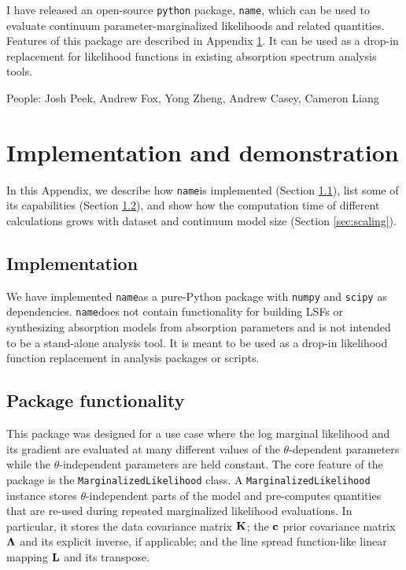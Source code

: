 \documentclass[manuscript]{aastex62}
\newcommand{\vx}[1]{{\bf {#1}}}
\newcommand{\pkgname}{\texttt{name}}
\begin{document}
I have released an open-source \texttt{python} package, \pkgname, which can be used to evaluate continuum parameter-marginalized likelihoods and related quantities.
Features of this package are described in Appendix \ref{sec:package-and-demos}.
It can be used as a drop-in replacement for likelihood functions in existing absorption spectrum analysis tools.

\acknowledgments People: Josh Peek, Andrew Fox, Yong Zheng, Andrew Casey, Cameron Liang


\appendix

\section{Implementation and demonstration}
\label{sec:package-and-demos}
In this Appendix, we describe how \pkgname is implemented (Section \ref{sec:implementation}), list some of its capabilities (Section \ref{sec:package-functionality}), and show how the computation time of different calculations grows with dataset and continuum model size (Section \ref{sec:scaling}).

\subsection{Implementation}
\label{sec:implementation}
We have implemented \pkgname as a pure-Python package with \texttt{numpy} and \texttt{scipy} as dependencies.
\pkgname does not contain functionality for building LSFs or synthesizing absorption models from absorption parameters and is not intended to be a stand-alone analysis tool.
It is meant to be used as a drop-in likelihood function replacement in analysis packages or scripts.

\subsection{Package functionality}
\label{sec:package-functionality}
This package was designed for a use case where the log marginal likelihood and its gradient are evaluated at many different values of the $\theta$-dependent parameters while the $\theta$-independent parameters are held constant.
The core feature of the package is the \texttt{MarginalizedLikelihood} class.
A \texttt{MarginalizedLikelihood} instance stores $\theta$-independent parts of the model and pre-computes quantities that are re-used during repeated marginalized likelihood evaluations.
In particular, it stores the data covariance matrix $\vx{K}$; the $\vx{c}$ prior covariance matrix $\vx{\Lambda}$ and its explicit inverse, if applicable; and the line spread function-like linear mapping $\vx{L}$ and its transpose.
\end{document}
